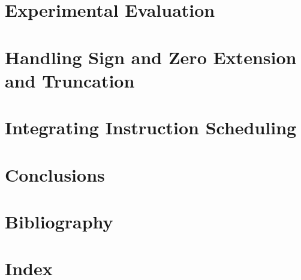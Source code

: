\documentclass[twoside]{kthdiss}
\begin{document}
\chapter{Experimental Evaluation}

\chapter{Handling Sign and Zero Extension and Truncation}

\chapter{Integrating Instruction Scheduling}

\chapter{Conclusions}

\backmatter

\chapter{Bibliography}

\chapter{Index}
\end{document}
